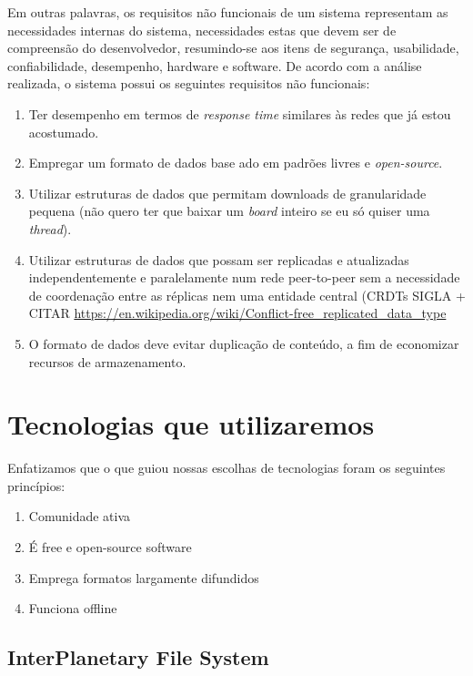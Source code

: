 Em outras palavras, os requisitos não funcionais de um sistema representam as necessidades internas do sistema, necessidades estas que devem ser de compreensão do desenvolvedor, resumindo-se aos itens de segurança, usabilidade, confiabilidade, desempenho, hardware e software.
De acordo com a análise realizada, o sistema possui os seguintes requisitos não funcionais:

\begin{enumerate}
    \item Ter desempenho em termos de \textit{response time} similares às redes que já estou acostumado.
    \item Empregar um formato de dados base ado em padrões livres e \textit{open-source}.
    \item Utilizar estruturas de dados que permitam downloads de granularidade pequena (não quero ter que baixar um \textit{board} inteiro se eu só quiser uma \textit{thread}).
    \item Utilizar estruturas de dados que possam ser replicadas e atualizadas independentemente e paralelamente num rede peer-to-peer sem a necessidade de coordenação entre as réplicas nem uma entidade central (CRDTs SIGLA + CITAR \url{https://en.wikipedia.org/wiki/Conflict-free_replicated_data_type}
    \item O formato de dados deve evitar duplicação de conteúdo, a fim de economizar recursos de armazenamento.
\end{enumerate}

\section{Tecnologias que utilizaremos}

Enfatizamos que o que guiou nossas escolhas de tecnologias foram os seguintes princípios:

\begin{enumerate}
    \item Comunidade ativa
    \item É free e open-source software
    \item Emprega formatos largamente difundidos
    \item Funciona offline
\end{enumerate}

\subsection{\label{sec:ipfs}InterPlanetary File System}

